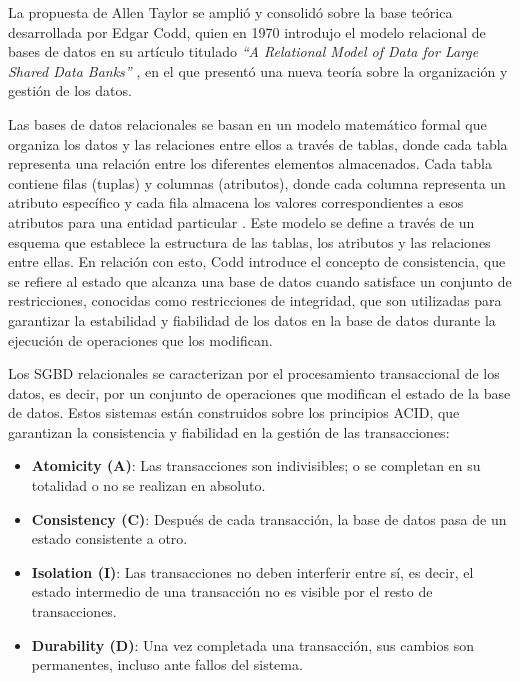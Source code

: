 La propuesta de Allen Taylor se amplió y consolidó sobre la base teórica desarrollada por Edgar Codd, 
quien en 1970 introdujo el modelo relacional de bases de datos en su artículo 
titulado \textit{“A Relational Model of Data for Large Shared Data Banks”} \cite{Codd1970}, 
en el que presentó una nueva teoría sobre la organización y gestión de los datos.

Las bases de datos relacionales se basan en un modelo matemático formal que organiza 
los datos y las relaciones entre ellos a través de tablas, donde cada tabla representa 
una relación entre los diferentes elementos almacenados. Cada tabla contiene filas 
(tuplas) y columnas (atributos), donde cada columna representa un atributo específico y 
cada fila almacena los valores correspondientes a esos atributos para una entidad 
particular \cite{Chen2016}. Este modelo se define a través de un esquema que establece 
la estructura de las tablas, los atributos y las relaciones entre ellas. 
En relación con esto, Codd introduce el concepto de consistencia, que se refiere al 
estado que alcanza una base de datos cuando satisface un conjunto de restricciones, 
conocidas como restricciones de integridad, que son utilizadas para garantizar la 
estabilidad y fiabilidad de los datos en la base de datos durante la ejecución de 
operaciones que los modifican.

Los SGBD relacionales se caracterizan por el procesamiento transaccional de los datos, 
es decir, por un conjunto de operaciones que modifican el estado de la base de datos. 
Estos sistemas están construidos sobre los principios ACID, que garantizan la 
consistencia y fiabilidad en la gestión de las transacciones:

\begin{itemize}
    \item \textbf{Atomicity (A)}: Las transacciones son indivisibles; o se completan 
    en su totalidad o no se realizan en absoluto.
    \item \textbf{Consistency (C)}: Después de cada transacción, la base de datos 
    pasa de un estado consistente a otro.
    \item \textbf{Isolation (I)}: Las transacciones no deben interferir entre sí, 
    es decir, el estado intermedio de una transacción no es visible por el resto de 
    transacciones.
    \item \textbf{Durability (D)}: Una vez completada una transacción, sus cambios 
    son permanentes, incluso ante fallos del sistema.
\end{itemize}

